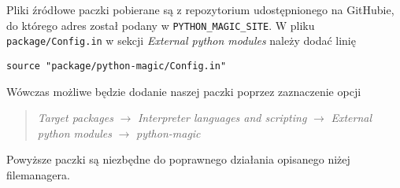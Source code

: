 \documentclass[10pt,a4paper]{article}
\begin{document}
Pliki źródłowe paczki pobierane są z repozytorium udostępnionego na GitHubie, do którego adres został podany w \texttt{PYTHON\_MAGIC\_SITE}. W pliku \texttt{package/Config.in} w sekcji \textit{External python modules} należy dodać linię
\begin{lstlisting}[style=bash]
source "package/python-magic/Config.in"
\end{lstlisting}
Wówczas możliwe będzie dodanie naszej paczki poprzez zaznaczenie opcji
\begin{quote}
	\textit{Target packages} $\rightarrow$ \textit{Interpreter languages and scripting} $\rightarrow$ \textit{External python modules} $\rightarrow$ \textit{python-magic}
\end{quote}
Powyższe paczki są niezbędne do poprawnego działania opisanego niżej filemanagera.
\end{document}
